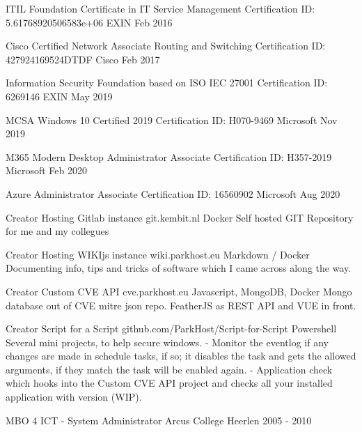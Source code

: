 \documentclass[11pt, letterpaper]{awesome-cv}
\begin{document}
\begin{cvhonors}

  \cvhonor
    {ITIL Foundation Certificate in IT Service Management}
    {Certification ID: 5.61768920506583e+06}
    {EXIN}
    {Feb 2016}

  \cvhonor
    {Cisco Certified Network Associate Routing and Switching}
    {Certification ID: 427924169524DTDF}
    {Cisco}
    {Feb 2017}

  \cvhonor
    {Information Security Foundation based on ISO IEC 27001}
    {Certification ID: 6269146}
    {EXIN}
    {May 2019}

  \cvhonor
    {MCSA Windows 10 Certified 2019}
    {Certification ID: H070-9469}
    {Microsoft}
    {Nov 2019}

  \cvhonor
    {M365 Modern Desktop Administrator Associate}
    {Certification ID: H357-2019}
    {Microsoft}
    {Feb 2020}

  \cvhonor
    {Azure Administrator Associate}
    {Certification ID: 16560902}
    {Microsoft}
    {Aug 2020}


\end{cvhonors}

\begin{cventries}

  \cventry
    {Creator}
    {Hosting Gitlab instance}
    {git.kembit.nl}
    {Docker}
    {Self hosted GIT Repository for me and my collegues}

  \cventry
    {Creator}
    {Hosting WIKIjs instance}
    {wiki.parkhost.eu}
    {Markdown / Docker}
    {Documenting info, tips and tricks of software which I came across along the way.}

  \cventry
    {Creator}
    {Custom CVE API}
    {cve.parkhost.eu}
    {Javascript, MongoDB, Docker}
    {Mongo database out of CVE mitre json repo. FeatherJS as REST API and VUE in front.}

  \cventry
    {Creator}
    {Script for a Script}
    {github.com/ParkHost/Script-for-Script}
    {Powershell}
    {Several mini projects, to help secure windows. - Monitor the eventlog if any changes are made in schedule tasks, if so; it disables the task and gets the allowed arguments, if they match the task will be enabled again. - Application check which hooks into the Custom CVE API project and checks all your installed application with version (WIP).}


\end{cventries}

\begin{cventries}

  \cventry
    {MBO 4 ICT - System Administrator}
    {Arcus College}
    {Heerlen}
    {2005 - 2010}
    {
    }


\end{cventries}

\end{document}
